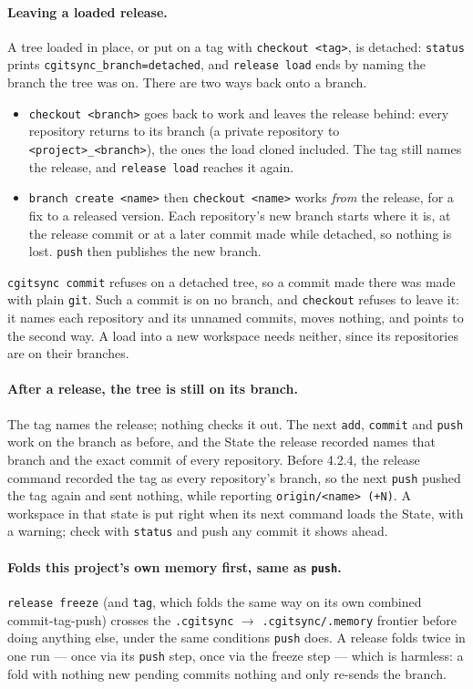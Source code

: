 \paragraph{Leaving a loaded release.} A tree loaded in place, or put on a tag
with \texttt{checkout <tag>}, is detached: \texttt{status} prints
\texttt{cgitsync\_branch=detached}, and \texttt{release load} ends by naming
the branch the tree was on. There are two ways back onto a branch.
\begin{itemize}
  \item \texttt{checkout <branch>} goes back to work and leaves the release
    behind: every repository returns to its branch (a private repository to
    \texttt{<project>\_<branch>}), the ones the load cloned included. The
    tag still names the release, and \texttt{release load} reaches it again.
  \item \texttt{branch create <name>} then \texttt{checkout <name>} works
    \emph{from} the release, for a fix to a released version. Each
    repository's new branch starts where it is, at the release commit or at
    a later commit made while detached, so nothing is lost. \texttt{push}
    then publishes the new branch.
\end{itemize}
\texttt{cgitsync commit} refuses on a detached tree, so a commit made there
was made with plain \texttt{git}. Such a commit is on no branch, and
\texttt{checkout} refuses to leave it: it names each repository and its
unnamed commits, moves nothing, and points to the second way. A load into a
new workspace needs neither, since its repositories are on their branches.

\paragraph{After a release, the tree is still on its branch.} The tag names
the release; nothing checks it out. The next \texttt{add}, \texttt{commit}
and \texttt{push} work on the branch as before, and the State the release
recorded names that branch and the exact commit of every repository. Before
4.2.4, the release command recorded the tag as every repository's branch,
so the next \texttt{push} pushed the tag again and sent nothing, while
reporting \texttt{origin/<name> (+N)}. A workspace in that state is put
right when its next command loads the State, with a warning; check with
\texttt{status} and push any commit it shows ahead.

\paragraph{Folds this project's own memory first, same as \texttt{push}.}
\texttt{release freeze} (and \texttt{tag}, which folds the same way on
its own combined commit-tag-push) crosses the \texttt{.cgitsync}
$\rightarrow$ \texttt{.cgitsync/.memory} frontier before doing anything
else, under the same conditions \texttt{push} does. A release
folds twice in one run --- once via its \texttt{push} step, once via
the freeze step --- which is harmless: a fold with nothing new
pending commits nothing and only re-sends the branch.

